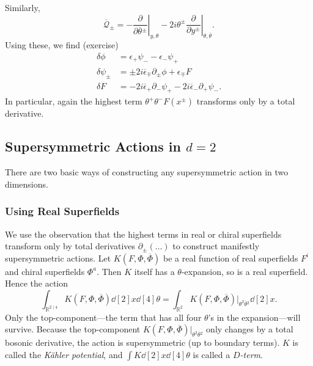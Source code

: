 Similarly, 
\begin{equation}
  \overline{\mathcal{Q}}{}_{\pm} = - \left.\frac{\partial }{\partial \overline{\theta}{}^{\pm}} \right\rvert_{y, \theta} - 2 i \theta^{\pm} \left. \frac{\partial }{\partial y^{\pm}} \right\rvert_{\theta, \overline{\theta}{}}.
\end{equation}
Using these, we find (exercise)
\begin{align}
  \delta \phi &= \epsilon_+ \psi_- - \epsilon_- \psi_+ \\
  \delta \psi_{\pm} &= \pm 2 i \overline{\epsilon}{}_{\mp} \partial_{\pm} \phi + \epsilon_{\mp} F \\
  \delta F &= -2 i \overline{\epsilon}{}_{+} \partial_- \psi_+ - 2 i \overline{\epsilon}{}_- \partial_+ \psi_-.
\end{align}
In particular, again the highest term $\theta^+ \theta^- F(x^{\pm})$ transforms only by a total derivative.

\subsection{Supersymmetric Actions in \texorpdfstring{$d = 2$}{Two Dimensions}}%
\label{sub:supersymmetric_actions}

There are two basic ways of constructing any supersymmetric action in two dimensions.

\subsubsection*{Using Real Superfields}%

We use the observation that the highest terms in real or chiral superfields transform only by total derivatives $\partial_{\pm} ( \dots )$ to construct manifestly supersymmetric actions.
Let $K(F, \Phi, \overline{\Phi}{})$ be a real function of real superfields $F^i$ and chiral superfields $\Phi^a$.
Then $K$ itself has a $\theta$-expansion, so is a real superfield.
Hence the action
\begin{equation}
  \int_{\mathbb{R}^{2 \mid 4}} K(F, \Phi, \overline{\Phi}{}) \dd[2]{x} \dd[4]{\theta} = \int_{\mathbb{R}^2} K(F, \Phi, \overline{\Phi}{}) \rvert_{\theta^2 \overline{\theta}{}^2} \dd[2]{x}.
\end{equation}
Only the top-component---the term that has all four $\theta$'s in the expansion---will survive.
Because the top-component $K(F, \Phi, \overline{\Phi}{})\rvert_{\theta^2 \overline{\theta}{}^2}$ only changes by a total bosonic derivative, the action is supersymmetric (up to boundary terms).
$K$ is called the \emph{Kähler potential}, and $\int K \dd[2]{x} \dd[4]{\theta}$ is called a \emph{$D$-term}.

